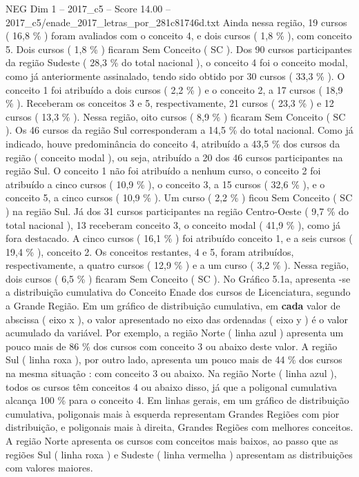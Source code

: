 \begin{textsample}{NEG Dim 1 – 2017\_c5 – Score 14.00 – 2017\_c5/enade\_2017\_letras\_por\_281c81746d.txt}
Ainda nessa região, 19 cursos ( 16,8 \% ) foram avaliados com o conceito 4, e dois cursos ( 1,8 \% ), com conceito 5.
Dois cursos ( 1,8 \% ) ficaram Sem Conceito ( SC ).
Dos 90 cursos participantes da região Sudeste ( 28,3 \% do total nacional ), o conceito 4 foi o conceito modal, como já anteriormente assinalado, tendo sido obtido por 30 cursos ( 33,3 \% ).
O conceito 1 foi atribuído a dois cursos ( 2,2 \% ) e o conceito 2, a 17 cursos ( 18,9 \% ).
Receberam os conceitos 3 e 5, respectivamente, 21 cursos ( 23,3 \% ) e 12 cursos ( 13,3 \% ).
Nessa região, oito cursos ( 8,9 \% ) ficaram Sem Conceito ( SC ).
Os 46 cursos da região Sul corresponderam a 14,5 \% do total nacional.
Como já indicado, houve predominância do conceito 4, atribuído a 43,5 \% dos cursos da região ( conceito modal ), ou seja, atribuído a 20 dos 46 cursos participantes na região Sul.
O conceito 1 não foi atribuído a nenhum curso, o conceito 2 foi atribuído a cinco cursos ( 10,9 \% ), o conceito 3, a 15 cursos ( 32,6 \% ), e o conceito 5, a cinco cursos ( 10,9 \% ).
Um curso ( 2,2 \% ) ficou Sem Conceito ( SC ) na região Sul.
Já dos 31 cursos participantes na região Centro-Oeste ( 9,7 \% do total nacional ), 13 receberam conceito 3, o conceito modal ( 41,9 \% ), como já fora destacado.
A cinco cursos ( 16,1 \% ) foi atribuído conceito 1, e a seis cursos ( 19,4 \% ), conceito 2.
Os conceitos restantes, 4 e 5, foram atribuídos, respectivamente, a quatro cursos ( 12,9 \% ) e a um curso ( 3,2 \% ).
Nessa região, dois cursos ( 6,5 \% ) ficaram Sem Conceito ( SC ).
No Gráfico 5.1a, apresenta -se a distribuição cumulativa do Conceito Enade dos cursos de Licenciatura, segundo a Grande Região.
Em um gráfico de distribuição cumulativa, em \textbf{cada} valor de abscissa ( eixo x ), o valor apresentado no eixo das ordenadas ( eixo y ) é o valor acumulado da variável.
Por exemplo, a região Norte ( linha azul ) apresenta um pouco mais de 86 \% dos cursos com conceito 3 ou abaixo deste valor.
A região Sul ( linha roxa ), por outro lado, apresenta um pouco mais de 44 \% dos cursos na mesma situação : com conceito 3 ou abaixo.
Na região Norte ( linha azul ), todos os cursos têm conceitos 4 ou abaixo disso, já que a poligonal cumulativa alcança 100 \% para o conceito 4.
Em linhas gerais, em um gráfico de distribuição cumulativa, poligonais mais à esquerda representam Grandes Regiões com pior distribuição, e poligonais mais à direita, Grandes Regiões com melhores conceitos.
A região Norte apresenta os cursos com conceitos mais baixos, ao passo que as regiões Sul ( linha roxa ) e Sudeste ( linha vermelha ) apresentam as distribuições com valores maiores.

\end{textsample}
